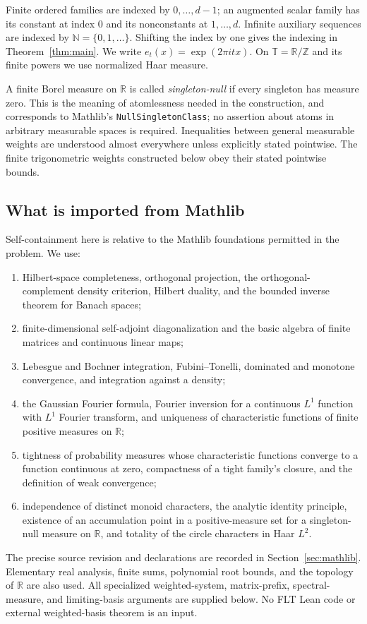 \documentclass[reqno,a4paper,12pt]{amsart}
\theoremstyle{definition}
\newcommand{\R}{\mathbb R}
\newcommand{\Z}{\mathbb Z}
\newcommand{\N}{\mathbb N}
\newcommand{\T}{\mathbb T}
\newcommand{\ml}[1]{\nolinkurl{#1}}
\begin{document}
Finite ordered families are indexed by $0,\ldots,d-1$; an augmented
scalar family has its constant at index $0$ and its nonconstants at
$1,\ldots,d$. Infinite auxiliary sequences are indexed by $\N=\{0,1,\ldots\}$.
Shifting the index by one gives the indexing in Theorem~\ref{thm:main}.
We write $e_t(x)=\exp(2\pi itx)$. On $\T=\R/\Z$ and its finite powers
we use normalized Haar measure.

A finite Borel measure on $\R$ is called \emph{singleton-null} if every
singleton has measure zero. This is the meaning of atomlessness needed
in the construction, and corresponds to Mathlib's
\ml{NullSingletonClass}; no assertion about atoms in arbitrary measurable
spaces is required. Inequalities between general measurable weights
are understood almost everywhere unless explicitly stated pointwise.
The finite trigonometric weights constructed below obey their stated
pointwise bounds.

\subsection{What is imported from Mathlib}
Self-containment here is relative to the Mathlib foundations permitted
in the problem. We use:
\begin{enumerate}
\item Hilbert-space completeness, orthogonal projection, the
orthogonal-complement density criterion, Hilbert duality, and the
bounded inverse theorem for Banach spaces;
\item finite-dimensional self-adjoint diagonalization and the basic
algebra of finite matrices and continuous linear maps;
\item Lebesgue and Bochner integration, Fubini--Tonelli, dominated and
monotone convergence, and integration against a density;
\item the Gaussian Fourier formula, Fourier inversion for a continuous
$L^1$ function with $L^1$ Fourier transform, and uniqueness of
characteristic functions of finite positive measures on $\R$;
\item tightness of probability measures whose characteristic functions
converge to a function continuous at zero, compactness of a tight
family's closure, and the definition of weak convergence;
\item independence of distinct monoid characters, the analytic identity
principle, existence of an accumulation point in a positive-measure
set for a singleton-null measure on $\R$, and totality of the circle
characters in Haar $L^2$.
\end{enumerate}
The precise source revision and declarations are recorded in
Section~\ref{sec:mathlib}. Elementary real analysis, finite sums,
polynomial root bounds, and the topology of $\R$ are also used.
All specialized weighted-system, matrix-prefix, spectral-measure,
and limiting-basis arguments are supplied below. No FLT Lean code or
external weighted-basis theorem is an input.
\end{document}
